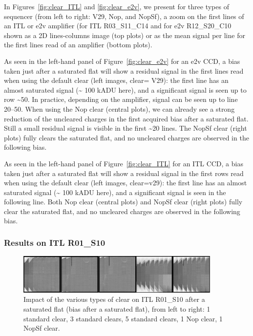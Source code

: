 
In Figures~\ref{fig:clear_ITL} and \ref{fig:clear_e2v}, we present for three types of sequencer (from left to
right: V29, Nop, and NopSf), a zoom on the first lines of an ITL or e2v
amplifier (for ITL R03\_S11\_C14 and for e2v
R12\_S20\_C10 shown as a 2D lines-columns
image (top plots) or as the mean signal per line for the first lines
read of an amplifier (bottom plots).

As seen in the left-hand panel of Figure~\ref{fig:clear_e2v}
for an e2v CCD, a bias taken just after a saturated flat will show a
residual signal in the first lines read when using the default clear
(left images, clear= V29): the first line has an almost saturated signal
(\textasciitilde{} 100 kADU here), and a significant signal is seen up
to row \textasciitilde50. In practice, depending on the 
amplifier, signal can be seen up to line 20--50. When using the Nop clear
(central plots), we can already see a strong reduction of the uncleared
charges in the first acquired bias after a saturated flat.  Still a small
residual signal is visible in the first \textasciitilde20 lines. The
NopSf clear (right plots) fully clears the saturated flat, and no
uncleared charges are observed in the following bias.

As seen in the left-hand panel of Figure~\ref{fig:clear_ITL}
for an ITL CCD, a bias taken just after a saturated flat will show a
residual signal in the first rows read when using the default clear
(left images, clear=v29): the first line has an almost saturated signal
(\textasciitilde{} 100 kADU here), and a significant signal is seen in
the following line. Both Nop clear (central plots) and NopSf clear
(right plots) fully clear the saturated flat, and no uncleared charges
are observed in the following bias.

\subsubsection{Results on ITL R01\_S10}\label{results-on-itl-r01s10}

\begin{figure}
\begin{centering}
\includegraphics[width=0.9\textwidth]{figures/Clear_R01_S10.png}
\end{centering}
\caption{Impact of the various types of clear on ITL
R01\_S10 after a saturated flat (bias after a saturated flat), from left
to right: 1 standard clear, 3 standard clears, 5 standard clears, 1 Nop
clear, 1 NopSf clear.}
\label{fig:clears_R01_S10}
\end{figure}

